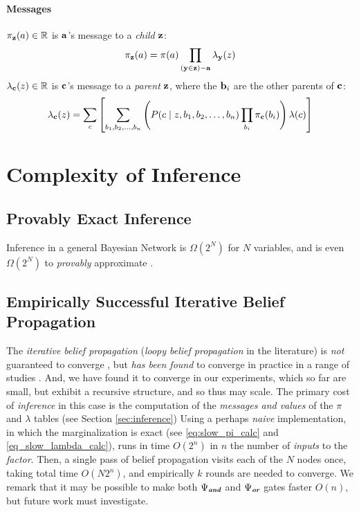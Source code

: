 \documentclass[11pt]{article}
\newcommand{\zvariable}{{\bf z}}
\newcommand{\cvariable}{{\bf c}}
\newcommand{\avariable}{{\bf a}}
\newcommand{\yvariable}{{\bf y}}
\newcommand{\opand}{\textbf{\em and}}
\newcommand{\opor}{\textbf{\em or}}
\begin{document}
\paragraph{Messages}
$\pi_\zvariable(a) \in \mathbb{R}$ is $\avariable$'s message to a {\em child} $\zvariable$:
\begin{equation}
    \pi_\zvariable(a) = \pi(a) \prod_{(\yvariable \in \zvariable) - \avariable} \lambda_\yvariable(z)
\end{equation}
$\lambda_\cvariable(z) \in \mathbb{R}$ is $\cvariable$'s message to a {\em parent} $\zvariable$, where the ${\bf b}_i$ are the other parents of $\cvariable$:
\begin{equation}
    \lambda_\cvariable(z) = \sum_{c} \left[ \sum_{b_1, b_2, \ldots, b_n} \left( P(c \mid z, b_1, b_2, \ldots, b_n) \prod_{b_i} \pi_\cvariable(b_i) \right) \lambda(c) \right]
    \label{eq_slow_lambda_calc}
\end{equation}

\section{Complexity of Inference}
\label{sec:complexity}
\subsection{Provably Exact Inference}
Inference in a general Bayesian Network is $\Omega(2^N)$ for $N$ variables, and is even $\Omega(2^N)$ to {\em provably} approximate \cite{Cooper1990, Roth1996HardnessApproxReasoning}.
\subsection{Empirically Successful Iterative Belief Propagation}
The {\em iterative belief propagation} ({\em loopy belief propagation} in the literature) is {\em not} guaranteed to converge \cite{neapolitan2003learning, koller2009probabilistic}, but {\em has been found} to converge in practice in a range of studies \cite{Smith2008, Murphy2013, Gormley2015}.
And, we have found it to converge in our experiments, which so far are small, but exhibit a recursive structure, and so thus may scale.
The primary cost of {\em inference} in this case is the computation of the {\em messages and values} of the $\pi$ and $\lambda$ tables (see Section \ref{sec:inference})
Using a perhaps {\em naive} implementation, in which the marginalization is exact (see \ref{eq:slow_pi_calc} and \ref{eq_slow_lambda_calc}), runs in time $O(2^n)$ in $n$ the number of {\em inputs} to the {\em factor}.
Then, a single pass of belief propagation visits each of the $N$ nodes once, taking total time $O(N2^n)$, and empirically $k$ rounds are needed to converge.
We remark that it may be possible to make both $\Psi_\opand$ and $\Psi_\opor$ gates faster $O(n)$, but future work must investigate.
\end{document}
